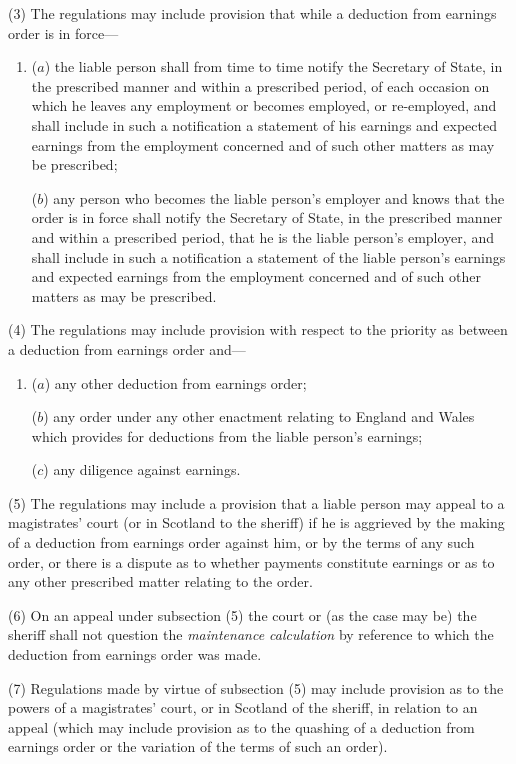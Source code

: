 \documentclass[12pt,a4paper]{article}
\begin{document}
(3) The regulations may include provision that while a deduction from earnings order is in force—
\begin{enumerate}\item[]
($a$) the liable person shall from time to time notify the Secretary of State, in the prescribed manner and within a prescribed period, of each occasion on which he leaves any employment or becomes employed, or re-employed, and shall include in such a notification a statement of his earnings and expected earnings from the employment concerned and of such other matters as may be prescribed;

($b$) any person who becomes the liable person’s employer and knows that the order is in force shall notify the Secretary of State, in the prescribed manner and within a prescribed period, that he is the liable person’s employer, and shall include in such a notification a statement of the liable person’s earnings and expected earnings from the employment concerned and of such other matters as may be prescribed.
\end{enumerate}

(4) The regulations may include provision with respect to the priority as between a deduction from earnings order and—
\begin{enumerate}\item[]
($a$) any other deduction from earnings order;

($b$) any order under any other enactment relating to England and Wales which provides for deductions from the liable person’s earnings;

($c$) any diligence against earnings.
\end{enumerate}

(5) The regulations may include a provision that a liable person may appeal to a magistrates' court (or in Scotland to the sheriff) if he is aggrieved by the making of a deduction from earnings order against him, or by the terms of any such order, or there is a dispute as to whether payments constitute earnings or as to any other prescribed matter relating to the order.

(6) On an appeal under subsection (5)  the court or (as the case may be) the sheriff shall not question the 
\emph{maintenance calculation}  %
by reference to which the deduction from earnings order was made.

(7) Regulations made by virtue of subsection (5)  may include provision as to the powers of a magistrates' court, or in Scotland of the sheriff, in relation to an appeal (which may include provision as to the quashing of a deduction from earnings order or the variation of the terms of such an order).
\end{document}
